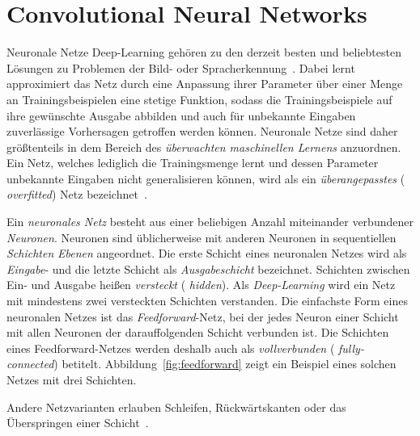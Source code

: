 \section{Convolutional Neural Networks}
\label{convolutional_neural_networks}

Neuronale Netze \bzw{} Deep-Learning gehören zu den derzeit besten und beliebtesten Lösungen zu Problemen der Bild- oder Spracherkennung~\cite{Nielsen}.
Dabei lernt \bzw{} approximiert das Netz durch eine Anpassung ihrer Parameter über einer Menge an Trainingsbeispielen eine stetige Funktion, sodass die Trainingsbeispiele auf ihre gewünschte Ausgabe abbilden und auch für unbekannte Eingaben zuverlässige Vorhersagen getroffen werden können.
Neuronale Netze sind daher größtenteils in dem Bereich des \emph{überwachten maschinellen Lernens} anzuordnen.
Ein Netz, welches lediglich die Trainingsmenge lernt und dessen Parameter unbekannte Eingaben nicht generalisieren können, wird als ein \emph{überangepasstes} (\engl{} \emph{overfitted}) Netz bezeichnet~\cite{Nielsen}.

Ein \emph{neuronales Netz} besteht aus einer beliebigen Anzahl miteinander verbundener \emph{Neuronen}.
Neuronen sind üblicherweise mit anderen Neuronen in sequentiellen \emph{Schichten} \bzw{} \emph{Ebenen} angeordnet.
Die erste Schicht eines neuronalen Netzes wird als \emph{Eingabe}- und die letzte Schicht als  \emph{Ausgabeschicht} bezeichnet.
Schichten zwischen Ein- und Ausgabe heißen \emph{versteckt} (\engl{} \emph{hidden}).
Als \emph{Deep-Learning} wird ein Netz mit mindestens zwei versteckten Schichten verstanden.
Die einfachste Form eines neuronalen Netzes ist das \emph{Feedforward}-Netz, bei der jedes Neuron einer Schicht mit allen Neuronen der darauffolgenden Schicht verbunden ist.
Die Schichten eines Feedforward-Netzes werden deshalb auch als \emph{vollverbunden} (\engl{} \emph{fully-connected}) betitelt.
Abbildung~\ref{fig:feedforward} zeigt ein Beispiel eines solchen Netzes mit drei Schichten.

Andere Netzvarianten erlauben \zB{} Schleifen, Rückwärtskanten oder das Überspringen einer Schicht~\cite{Nielsen}.

